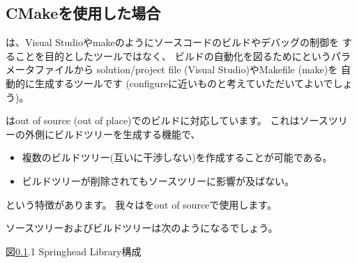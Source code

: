 \newpage
\subsection{CMakeを使用した場合}
\label{subsec:WhenUsedCMake}

\noindent
\cmake は、Visual Studioやmakeのようにソースコードのビルドやデバッグの制御を
することを目的としたツールではなく、
ビルドの自動化を図るために\CMakeLists というパラメータファイルから
solution/project file (Visual Studio)やMakefile (make)を
自動的に生成するツールです
(configureに近いものと考えていただいてよいでしょう)。

\cmake はout of source (out of place)でのビルドに対応しています。
これはソースツリーの外側にビルドツリーを生成する機能で、
\begin{itemize}
  \item	複数のビルドツリー(互いに干渉しない)を作成することが可能である。
  \item	ビルドツリーが削除されてもソースツリーに影響が及ばない。
\end{itemize}
という特徴があります。
我々は\cmake をout of sourceで使用します。

\medskip
ソースツリーおよびビルドツリーは次のようになるでしょう。

\medskip
\begin{narrow}
    \begin{narrow}\begin{minipage}{\textwidth}
	\medskip
    \end{minipage}\end{narrow}
\end{narrow}
\begin{center}図\ref{subsec:WhenUsedCMake}.1 Springhead Library構成\end{center}

